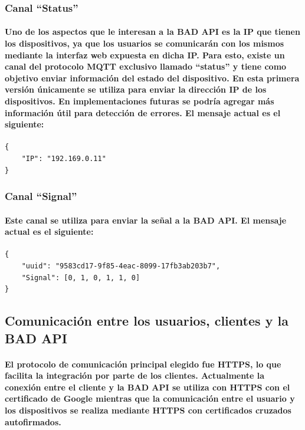 \documentclass{article}
\begin{document}
\subsubsection{Canal “Status”}
\paragraph{
Uno de los aspectos que le interesan a la BAD API es la IP que tienen los dispositivos, ya que los usuarios se comunicarán con los mismos mediante la interfaz web expuesta en dicha IP. Para esto, existe un canal del protocolo MQTT exclusivo llamado “status” y tiene como objetivo enviar información del estado del dispositivo. En esta primera versión únicamente se utiliza para enviar la dirección IP de los dispositivos. En implementaciones futuras se podría agregar más información útil para detección de errores. El mensaje actual es el siguiente:
}
\begin{verbatim}
{
    "IP": "192.169.0.11"
}
\end{verbatim}

\subsubsection{Canal “Signal”}
\paragraph{
Este canal se utiliza para enviar la señal a la BAD API. El mensaje actual es el siguiente:
}
\begin{verbatim}
{
    "uuid": "9583cd17-9f85-4eac-8099-17fb3ab203b7",
    "Signal": [0, 1, 0, 1, 1, 0]
}
\end{verbatim}

\subsection{Comunicación entre los usuarios, clientes y la BAD API}
\paragraph{
El protocolo de comunicación principal elegido fue HTTPS, lo que facilita la integración por parte de los clientes. Actualmente la conexión entre el cliente y la BAD API se utiliza con HTTPS con el certificado de Google mientras que la comunicación entre el usuario y los dispositivos se realiza mediante HTTPS con certificados cruzados autofirmados.
}
\end{document}
